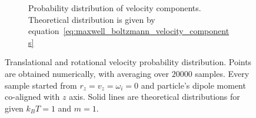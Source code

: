 \begin{figure}[h]
\begin{subfigure}[t]{0.45\textwidth}
		\captionsetup{justification=centering, width=0.9\textwidth}
		\caption{Probability distribution of velocity components. Theoretical distribution is given by equation~\eqref{eq:maxwell_boltzmann_velocity_components}}
	\end{subfigure}
	\captionsetup{justification=centering, width=0.9\textwidth}
	\caption{Translational and rotational velocity probability distribution. Points are obtained numerically, with averaging over $20000$ samples. Every sample started from $r_z = v_z = \omega_i = 0$ and particle's dipole moment co-aligned with $z$ axis. Solid lines are theoretical distributions for given $k_BT = 1$ and $m = 1$.}
	\label{fig:velocity_distributions}
\end{figure}